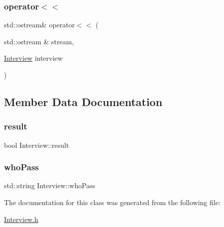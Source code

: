 \subsubsection{\texorpdfstring{operator$<$$<$}{operator<<}}
{\footnotesize\ttfamily std\+::ostream\& operator$<$$<$ (\begin{DoxyParamCaption}\item[{std\+::ostream \&}]{stream,  }\item[{\hyperlink{class_interview}{Interview}}]{interview }\end{DoxyParamCaption})\hspace{0.3cm}{\ttfamily [friend]}}



\subsection{Member Data Documentation}
\hypertarget{class_interview_aa456226f23acfdb23a6c94eab33e3cbb}{}\label{class_interview_aa456226f23acfdb23a6c94eab33e3cbb} 
\subsubsection{\texorpdfstring{result}{result}}
{\footnotesize\ttfamily bool Interview\+::result\hspace{0.3cm}{\ttfamily [private]}}

\hypertarget{class_interview_a8621e9f225dce314abaf77b7854649f6}{}\label{class_interview_a8621e9f225dce314abaf77b7854649f6} 
\subsubsection{\texorpdfstring{who\+Pass}{whoPass}}
{\footnotesize\ttfamily std\+::string Interview\+::who\+Pass\hspace{0.3cm}{\ttfamily [private]}}



The documentation for this class was generated from the following file\+:\begin{DoxyCompactItemize}
\item 
\hyperlink{_interview_8h}{Interview.\+h}\end{DoxyCompactItemize}
